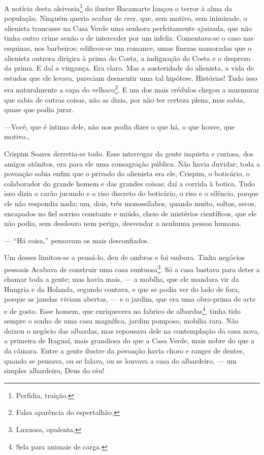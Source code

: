 A notícia desta aleivosia\footnote{Perfídia, traição.} do ilustre
Bacamarte lançou o terror à alma da população. Ninguém queria acabar de
crer, que, sem motivo, sem inimizade, o alienista trancasse na Casa
Verde uma senhora perfeitamente ajuizada, que não tinha outro crime
senão o de interceder por um infeliz. Comentava-se o caso nas esquinas,
nos barbeiros; edificou-se um romance, umas finezas namoradas que o
alienista outrora dirigira à prima do Costa, a indignação do Costa e o
desprezo da prima. E daí a vingança. Era claro. Mas a austeridade do
alienista, a vida de estudos que ele levava, pareciam desmentir uma tal
hipótese. Histórias! Tudo isso era naturalmente a capa do
velhaco\footnote{Falsa aparência do espertalhão.}. E um dos mais
crédulos chegou a murmurar que sabia de outras coisas, não as dizia, por
não ter certeza plena, mas sabia, quase que podia jurar.

---Você, que é íntimo dele, não nos podia dizer o que há, o que houve,
que motivo\ldots{}

Crispim Soares derretia-se todo. Esse interrogar da gente inquieta e
curiosa, dos amigos atônitos, era para ele uma consagração pública. Não
havia duvidar; toda a povoação sabia enfim que o privado do alienista
era ele, Crispim, o boticário, o colaborador do grande homem e das
grandes coisas; daí a corrida à botica. Tudo isso dizia o carão jucundo
e o riso discreto do boticário, o riso e o silêncio, porque ele não
respondia nada; um, dois, três monossílabos, quando muito, soltos,
secos, encapados no fiel sorriso constante e miúdo, cheio de mistérios
científicos, que ele não podia, sem desdouro nem perigo, desvendar a
nenhuma pessoa humana.

--- ``Há coisa,'' pensavam os mais desconfiados.

Um desses limitou-se a pensá-lo, deu de ombros e foi embora. Tinha
negócios pessoais Acabava de construir uma casa suntuosa\footnote{Luxuosa,
  opulenta.}. Só a casa bastava para deter a chamar toda a gente; mas
havia mais, --- a mobília, que ele mandara vir da Hungria e da Holanda,
segundo contava, e que se podia ver do lado de fora, porque as janelas
viviam abertas, --- e o jardim, que era uma obra-prima de arte e de
gosto. Esse homem, que enriquecera no fabrico de albardas\footnote{Sela
  para animais de carga.}, tinha tido sempre o sonho de uma casa
magnífica, jardim pomposo, mobília rara. Não deixou o negócio das
albardas, mas repousava dele na contemplação da casa nova, a primeira de
Itaguaí, mais grandiosa do que a Casa Verde, mais nobre do que a da
câmara. Entre a gente ilustre da povoação havia choro e ranger de
dentes, quando se pensava, ou se falava, ou se louvava a casa do
albardeiro, --- um simples albardeiro, Deus do céu!

